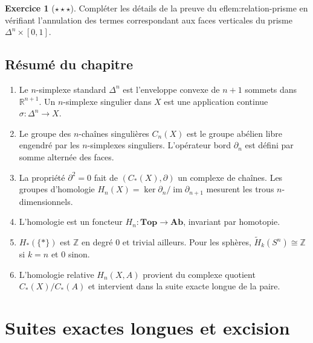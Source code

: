 \documentclass[12pt,a4paper,openany]{book}
\theoremstyle{definition}
\newtheorem{exercice}{Exercice}[chapter]
\theoremstyle{plain}
\theoremstyle{remark}
\newcommand{\Z}{\mathbb{Z}}
\newcommand{\R}{\mathbb{R}}
\DeclareMathOperator{\im}{im}
\begin{document}
\begin{exercice}[$\star\star\star$]\label{exo:prisme-detail}
Compléter les détails de la preuve du 
ef{lem:relation-prisme} en vérifiant l'annulation
des termes correspondant aux faces verticales du prisme $\Delta^n \times [0,1]$.
\end{exercice}

\section*{Résumé du chapitre}\label{sec:resume-ch5}

\begin{enumerate}[label=\textbf{\arabic*.}]
  \item Le $n$-simplexe standard $\Delta^n$ est l'enveloppe convexe de $n+1$ sommets dans $\R^{n+1}$.
  Un $n$-simplexe singulier dans $X$ est une application continue $\sigma \colon \Delta^n \to X$.
  \item Le groupe des $n$-chaînes singulières $C_n(X)$ est le groupe abélien libre engendré par les
  $n$-simplexes singuliers. L'opérateur bord $\partial_n$ est défini par somme alternée des faces.
  \item La propriété $\partial^2 = 0$ fait de $(C_*(X), \partial)$ un complexe de chaînes.
  Les groupes d'homologie $H_n(X) = \ker \partial_n / \im \partial_{n+1}$ mesurent les trous
  $n$-dimensionnels.
  \item L'homologie est un foncteur $H_n \colon \mathbf{Top} \to \mathbf{Ab}$, invariant par homotopie.
  \item $H_*(\{*\})$ est $\Z$ en degré $0$ et trivial ailleurs. Pour les sphères,
  $\widetilde{H}_k(S^n) \cong \Z$ si $k=n$ et $0$ sinon.
  \item L'homologie relative $H_n(X,A)$ provient du complexe quotient $C_*(X)/C_*(A)$
  et intervient dans la suite exacte longue de la paire.
\end{enumerate}



\chapter{Suites exactes longues et excision}\label{chap:suites-exactes}
\minitoc\vspace{1cm}
\end{document}
